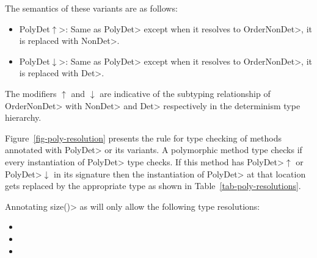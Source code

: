 %
%
%
%

The semantics of these variants are as follows:
\begin{itemize}
    \item \<PolyDet$\uparrow$>: Same as \<PolyDet> except when it resolves to \<OrderNonDet>, it is replaced with \<NonDet>.
    \item \<PolyDet$\downarrow$>: Same as \<PolyDet> except when it resolves to \<OrderNonDet>, it is replaced with \<Det>.
\end{itemize} 
The modifiers $\uparrow$ and $\downarrow$ are indicative of the subtyping relationship of \<OrderNonDet> with \<NonDet> and \<Det> respectively
in the determinism type hierarchy.

Figure~\ref{fig-poly-resolution} presents the rule for type checking of methods annotated with \<PolyDet> or its variants.
A polymorphic method type checks if every instantiation of \<PolyDet> type checks. If this method has \<PolyDet>$\uparrow$ or \<PolyDet>$\downarrow$
in its signature then the instantiation of \<PolyDet> at that location gets replaced by the appropriate type as shown in Table~\ref{tab-poly-resolutions}.

Annotating \<size()> as  will only allow the following type resolutions:
\begin{itemize}
    \item {}
    \item {}
    \item {}
\end{itemize}

